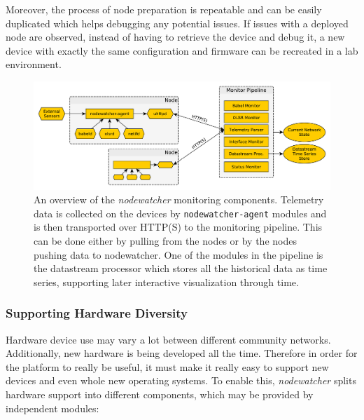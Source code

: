 \documentclass[5p,sort&compress]{elsarticle}
\newcommand{\nodewatcher}{\textit{nodewatcher}}
\begin{document}
Moreover, the process of node preparation is repeatable and can be easily duplicated which helps debugging any potential issues.
If issues with a deployed node are observed, instead of having to retrieve the device and debug it, a new device with exactly the same configuration and firmware can be recreated in a lab environment.

\begin{figure}
  \centering
  \includegraphics[scale=0.5]{figures/monitoring-pipeline.pdf}
  \caption{An overview of the \nodewatcher{} monitoring components. Telemetry data is collected on the devices by \texttt{nodewatcher-agent} modules and is then transported over HTTP(S) to the monitoring pipeline. This can be done either by pulling from the nodes or by the nodes pushing data to nodewatcher. One of the modules in the pipeline is the datastream processor which stores all the historical data as time series, supporting later interactive visualization through time.}
  \label{fig:monitoring-pipeline}
\end{figure}

\subsubsection{Supporting Hardware Diversity}

Hardware device use may vary a lot between different community networks.
Additionally, new hardware is being developed all the time.
Therefore in order for the platform to really be useful, it must make it really easy to support new devices and even whole new operating systems.
To enable this, \nodewatcher{} splits hardware support into different components, which may be provided by independent modules:
\end{document}
